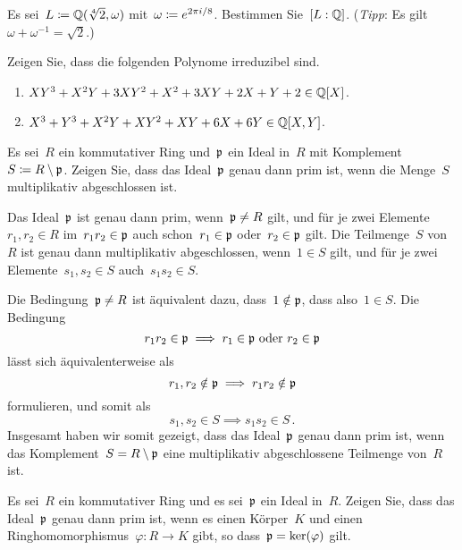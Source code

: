 \documentclass{scrartcl}
\begin{document}
\begin{exercise}[subtitle = {Erstklausur~18/19}]
  Es sei~$L \coloneqq \mathbb{Q}(\sqrt[4]{2}, \omega)$ mit~$\omega \coloneqq e^{2 \pi i / 8}$.
  Bestimmen Sie~$[L : \mathbb{Q}]$.
  (\emph{Tipp}: Es gilt~$\omega + \omega^{-1} = \sqrt{2}$.)
\end{exercise}

\begin{exercise}
  Zeigen Sie, dass die folgenden Polynome irreduzibel sind.
  \begin{enumerate}
    \item
      $X Y^3 + X^2 Y + 3 X Y^2 + X^2 + 3 X Y + 2 X + Y + 2 \in \mathbb{Q}[X]$.
    \item
      $X^3 + Y^3 + X^2 Y + X Y^2 + XY + 6X + 6Y \in \mathbb{Q}[X,Y]$.
  \end{enumerate}
\end{exercise}

\begin{exercise}
  Es sei~$R$ ein kommutativer Ring und~$\mathfrak{p}$ ein Ideal in~$R$ mit Komplement~$S \coloneqq R \setminus \mathfrak{p}$.
  Zeigen Sie, dass das Ideal~$\mathfrak{p}$ genau dann prim ist, wenn die Menge~$S$ multiplikativ abgeschlossen ist.
\end{exercise}

\begin{solution}
  Das Ideal~$\mathfrak{p}$ ist genau dann prim, wenn~$\mathfrak{p} \neq R$ gilt, und für je zwei Elemente~$r_1, r_2 \in R$ im~$r_1 r_2 \in \mathfrak{p}$ auch schon~$r_1 \in \mathfrak{p}$ oder~$r_2 \in \mathfrak{p}$ gilt.
  Die Teilmenge~$S$ von~$R$ ist genau dann multiplikativ abgeschlossen, wenn~$1 \in S$ gilt, und für je zwei Elemente~$s_1, s_2 \in S$ auch~$s_1 s_2 \in S$.

  Die Bedingung~$\mathfrak{p} \neq R$ ist äquivalent dazu, dass~$1 \notin \mathfrak{p}$, dass also~$1 \in S$.
  Die Bedingung
  \[
    r_1 r_2 \in \mathfrak{p}
    \implies
    \text{$r_1 \in \mathfrak{p}$ oder~$r_2 \in \mathfrak{p}$}
  \]
  lässt sich äquivalenterweise als
  \[
    r_1, r_2 \notin \mathfrak{p} \implies r_1 r_2 \notin \mathfrak{p}
  \]
  formulieren, und somit als
  \[
    s_1, s_2 \in S \implies s_1 s_2 \in S \,.
  \]
  Insgesamt haben wir somit gezeigt, dass das Ideal~$\mathfrak{p}$ genau dann prim ist, wenn das Komplement~$S = R \setminus \mathfrak{p}$ eine multiplikativ abgeschlossene Teilmenge von~$R$ ist.
\end{solution}

\begin{exercise}
  Es sei~$R$ ein kommutativer Ring und es sei~$\mathfrak{p}$ ein Ideal in~$R$.
  Zeigen Sie, dass das Ideal~$\mathfrak{p}$ genau dann prim ist, wenn es einen Körper~$K$ und einen Ringhomomorphismus~$\varphi \colon R \to K$ gibt, so dass~$\mathfrak{p} = \ker(\varphi)$ gilt.
\end{exercise}
\end{document}
